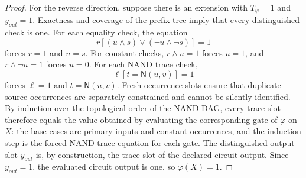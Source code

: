 \documentclass[10.5pt,a4paper]{article}
\newcommand{\NAND}{\mathsf{N}}
\begin{document}
\begin{proof}
For the reverse direction, suppose there is an extension with \(T_\varphi=1\) and \(y_{out}=1\).  Exactness and
coverage of the prefix tree imply that every distinguished check is one.  For each equality check, the equation
\[
 r[(u\wedge s)\vee(\neg u\wedge\neg s)]=1
\]
forces \(r=1\) and \(u=s\).  For constant checks, \(r\wedge u=1\) forces \(u=1\), and
\(r\wedge\neg u=1\) forces \(u=0\).  For each NAND trace check,
\[
 \ell[t=\NAND(u,v)]=1
\]
forces \(\ell=1\) and \(t=\NAND(u,v)\).  Fresh occurrence slots ensure that duplicate source occurrences are
separately constrained and cannot be silently identified.  By induction over the topological order of the NAND
DAG, every trace slot therefore equals the value obtained by evaluating the corresponding gate of \(\varphi\) on
\(X\): the base cases are primary inputs and constant occurrences, and the induction step is the forced NAND
trace equation for each gate.  The distinguished output slot \(y_{out}\) is, by construction, the trace slot of the
declared circuit output.  Since \(y_{out}=1\), the evaluated circuit output is one, so \(\varphi(X)=1\).
\end{proof}
\end{document}
